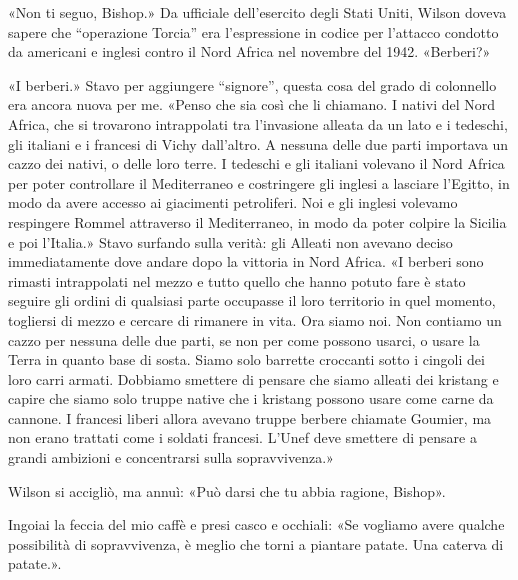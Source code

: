 «Non ti seguo, Bishop.» Da ufficiale dell'esercito degli Stati Uniti,
Wilson doveva sapere che ``operazione Torcia'' era l'espressione in
codice per l'attacco condotto da americani e inglesi contro il Nord
Africa nel novembre del 1942. «Berberi?»

«I berberi.» Stavo per aggiungere ``signore'', questa cosa del grado di
colonnello era ancora nuova per me. «Penso che sia così che li chiamano.
I nativi del Nord Africa, che si trovarono intrappolati tra l'invasione
alleata da un lato e i tedeschi, gli italiani e i francesi di Vichy
dall'altro. A nessuna delle due parti importava un cazzo dei nativi, o
delle loro terre. I tedeschi e gli italiani volevano il Nord Africa per
poter controllare il Mediterraneo e costringere gli inglesi a lasciare
l'Egitto, in modo da avere accesso ai giacimenti petroliferi. Noi e gli
inglesi volevamo respingere Rommel attraverso il Mediterraneo, in modo
da poter colpire la Sicilia e poi l'Italia.» Stavo surfando sulla
verità: gli Alleati non avevano deciso immediatamente dove andare dopo
la vittoria in Nord Africa. «I berberi sono rimasti intrappolati nel
mezzo e tutto quello che hanno potuto fare è stato seguire gli ordini di
qualsiasi parte occupasse il loro territorio in quel momento, togliersi
di mezzo e cercare di rimanere in vita. Ora siamo noi. Non contiamo un
cazzo per nessuna delle due parti, se non per come possono usarci, o
usare la Terra in quanto base di sosta. Siamo solo barrette croccanti
sotto i cingoli dei loro carri armati. Dobbiamo smettere di pensare che
siamo alleati dei kristang e capire che siamo solo truppe native che i
kristang possono usare come carne da cannone. I francesi liberi allora
avevano truppe berbere chiamate Goumier, ma non erano trattati come i
soldati francesi. L'Unef deve smettere di pensare a grandi ambizioni e
concentrarsi sulla sopravvivenza.»

Wilson si accigliò, ma annuì: «Può darsi che tu abbia ragione, Bishop».

Ingoiai la feccia del mio caffè e presi casco e occhiali: «Se vogliamo
avere qualche possibilità di sopravvivenza, è meglio che torni a
piantare patate. Una caterva di patate.».

\hfill\break

